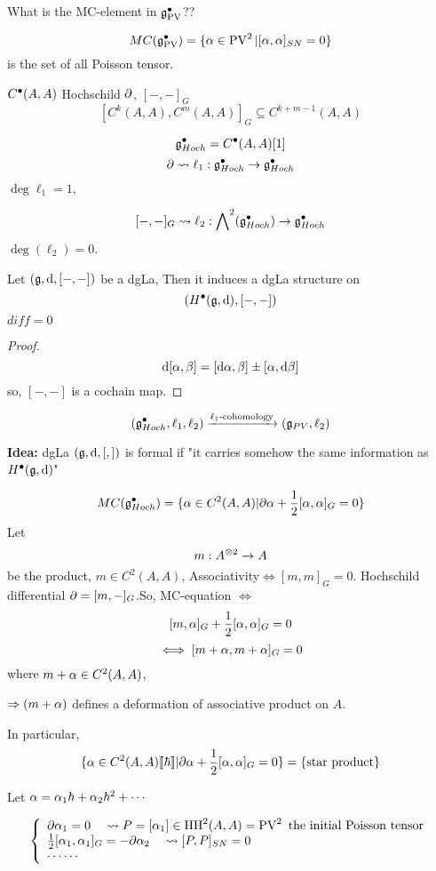 What is the MC-element in $\mathfrak{g}_{\operatorname{PV}}^{\bullet}$??

$$MC(\mathfrak{g}_{\operatorname{PV}}^{\bullet})=\{\alpha\in\operatorname{PV}^2|[\alpha,\alpha]_{SN}=0\}$$
is the set of all Poisson tensor.

$C^{\bullet}(A,A)$ Hochschild $\partial$, $[-,-]_G$
$$[C^k(A,A),C^m(A,A)]_G\subseteq C^{k+m-1}(A,A)$$

\begin{definition}
$$\mathfrak{g}_{Hoch}^{\bullet}=C^{\bullet}(A,A)[1]$$
$$\partial\rightsquigarrow\ell_1:\mathfrak{g}_{Hoch}^{\bullet}\to\mathfrak{g}_{Hoch}^{\bullet}$$
$\deg\ell_1=1$,

$$[-,-]_G\rightsquigarrow\ell_2:\bigwedge\nolimits^{2}(\mathfrak{g}_{Hoch}^{\bullet})\to\mathfrak{g}_{Hoch}^{\bullet}$$
$\deg(\ell_2)=0$.
\end{definition}

\begin{prop}
Let $(\mathfrak{g},\mathrm{d},[-,-])$ be a dgLa,
Then it induces a dgLa structure on
$$(H^{\bullet}(\mathfrak{g},\mathrm{d}),[-,-])$$
$diff=0$
\end{prop}
\begin{proof}
$$\mathrm{d}[\alpha,\beta]=[\mathrm{d}\alpha,\beta]\pm[\alpha,\mathrm{d}\beta]$$
so, $[-,-]$ is a cochain map.
\end{proof}

$$(\mathfrak{g}_{Hoch}^{\bullet},\ell_1,\ell_2)\xrightarrow{\ell_1\text{-cohomology}}
(\mathfrak{g}_{PV},\ell_2)$$

\textbf{Idea:} dgLa $(\mathfrak{g},\mathrm{d},[,])$ is formal if
"it carries somehow the same information as $H^{\bullet}(\mathfrak{g},\mathrm{d})$"

$$MC(\mathfrak{g}_{Hoch}^{\bullet})=
\{\alpha\in C^2(A,A)|\partial\alpha+\frac{1}{2}[\alpha,\alpha]_G=0\}$$
Let
$$m: A^{\otimes 2}\to A$$
be the product, $m\in C^2(A,A)$,
Associativity$\iff[m,m]_G=0$.
Hochschild differential $\partial=[m,-]_G$.So,
MC-equation $\iff$
$$[m,\alpha]_G+\frac{1}{2}[\alpha,\alpha]_G=0$$
$$\iff [m+\alpha,m+\alpha]_G=0$$
where $m+\alpha\in C^2(A,A)$, %

$\Rightarrow (m+\alpha)$ defines a deformation of associative product on $A$.

In particular,
$$\{\alpha\in C^2(A,A)[\![\hbar]\!]|\partial\alpha+\frac{1}{2}[\alpha,\alpha]_G=0\}=\{\text{star product}\}$$

Let $\alpha=\alpha_1\hbar+\alpha_2\hbar^2+\cdots$

$$
  \left\{
    \begin{array}{l}
      \partial\alpha_1=0\quad \rightsquigarrow P=[\alpha_1]\in\operatorname{HH}^2(A,A)=\operatorname{PV}^2\text{ the initial Poisson tensor}\\
      \frac{1}{2}[\alpha_1,\alpha_1]_G=-\partial\alpha_2 \quad\rightsquigarrow[P,P]_{SN}=0\\
      \cdots\cdots
    \end{array}
  \right.
$$


